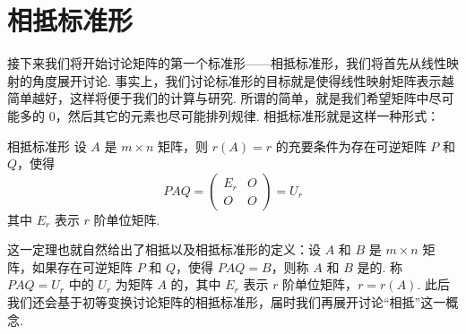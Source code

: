 \section{相抵标准形}

接下来我们将开始讨论矩阵的第一个标准形——相抵标准形，我们将首先从线性映射的角度展开讨论. 事实上，我们讨论标准形的目标就是使得线性映射矩阵表示越简单越好，这样将便于我们的计算与研究. 所谓的简单，就是我们希望矩阵中尽可能多的 $0$，然后其它的元素也尽可能排列规律. 相抵标准形就是这样一种形式：

\begin{theorem}{}{相抵标准形}
    设 $A$ 是 $m\times n$ 矩阵，则 $r(A) = r$ 的充要条件为存在可逆矩阵 $P$ 和 $Q$，使得
    \[PAQ = \begin{pmatrix}
            E_r & O \\ O & O
        \end{pmatrix} = U_r\]
    其中 $E_r$ 表示 $r$ 阶单位矩阵.
\end{theorem}

这一定理也就自然给出了相抵以及相抵标准形的定义：设 $A$ 和 $B$ 是 $m \times n$ 矩阵，如果存在可逆矩阵 $P$ 和 $Q$，使得 $PAQ = B$，则称 $A$ 和 $B$ 是的. 称 $PAQ = U_r$ 中的 $U_r$ 为矩阵 $A$ 的，其中 $E_r$ 表示 $r$ 阶单位矩阵，$r = r(A)$. 此后我们还会基于初等变换讨论矩阵的相抵标准形，届时我们再展开讨论``相抵''这一概念.

